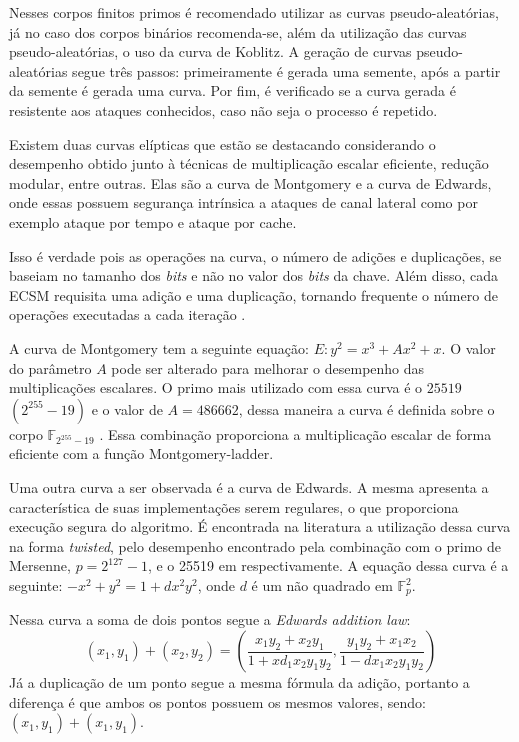 Nesses corpos finitos primos é recomendado utilizar as curvas pseudo-aleatórias, já no caso dos corpos binários recomenda-se, além da utilização das curvas pseudo-aleatórias, o uso da curva de Koblitz. A geração de curvas pseudo-aleatórias segue três passos: primeiramente é gerada uma semente, após a partir da semente é gerada uma curva. Por fim, é verificado se a curva gerada é resistente aos ataques conhecidos, caso não seja o processo é repetido.

Existem duas curvas elípticas que estão se destacando considerando o desempenho obtido junto à técnicas de multiplicação escalar eficiente, redução modular, entre outras. Elas são a curva de Montgomery e a curva de Edwards, onde essas possuem segurança intrínsica a ataques de canal lateral como por exemplo ataque por tempo e ataque por cache. 

Isso é verdade pois as operações na curva, o número de adições e duplicações, se baseiam no tamanho dos \textit{bits} e não no valor dos \textit{bits} da chave. Além disso, cada ECSM requisita uma adição e uma duplicação, tornando frequente o número de operações executadas a cada iteração \cite{Okeya2000}.

A curva de Montgomery tem a seguinte equação: $E: y^2 = x^3 + Ax^2 + x$. O valor do parâmetro $A$ pode ser alterado para melhorar o desempenho das multiplicações escalares. O primo mais utilizado com essa curva é o $25519$ $(2^{255}-19)$ e o valor de $A = 486662$, dessa maneira a curva é definida sobre o corpo $\mathbb{F}_{2^{255}-19}$ \cite{Dull:2015:HCM:2834659.2834708}. Essa combinação proporciona a multiplicação escalar de forma eficiente com a função Montgomery-ladder.

Uma outra curva a ser observada é a curva de Edwards. A mesma apresenta a característica de suas implementações serem regulares, o que proporciona execução segura do algoritmo. É encontrada na literatura a utilização dessa curva na forma \textit{twisted}, pelo desempenho encontrado pela combinação com o primo de Mersenne, $p = 2^{127} - 1$, e o 25519 em \cite{longa:2015, Bernstein2012} respectivamente. A equação dessa curva é a seguinte: $-x^2 + y^2 = 1 + dx^2y^2$, onde $d$ é um não quadrado em $\mathbb{F}_p^2$.

Nessa curva a soma de dois pontos segue a \textit{Edwards addition law}:
$$ (x_1,y_1) + (x_2,y_2) = (\frac{x_1y_2 + x_2y_1}{1 + xd_1x_2y_1y_2},\frac{y_1y_2 + x_1x_2}{1 - dx_1x_2y_1y_2}) $$
Já a duplicação de um ponto segue a mesma fórmula da adição, portanto a diferença é que ambos os pontos possuem os mesmos valores, sendo: $(x_1, y_1) + (x_1, y_1)$.

